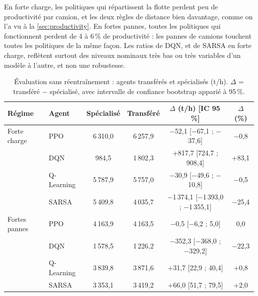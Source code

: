 \documentclass[11pt,a4paper]{article}
\newif\ifrevmarks
\newcommand{\revtag}[1]{\ifrevmarks\textsuperscript{\textcolor{red!70!black}{\scriptsize[#1]}}\fi}
\newenvironment{revbloc}[1]{\par\ifrevmarks\color{revcolor}\noindent\revtag{#1}\ \fi}{\par}
\newif\ifcorrmarks
\newcommand{\corr}[1]{\ifcorrmarks\textcolor{corrcolor}{#1}\else#1\fi}
\begin{document}
\begin{revbloc}{T31}
\corr{En forte charge, les politiques qui répartissent la flotte perdent peu de productivité par camion, et les deux règles de distance bien davantage, comme on l'a vu à la \cref{sec:productivity}. En fortes pannes, toutes les politiques qui fonctionnent perdent de 4 à 6\,\% de productivité : les pannes de camions touchent toutes les politiques de la même façon. Les ratios de DQN, et de SARSA en forte charge, reflètent surtout} des niveaux nominaux très bas ou très variables d'un modèle à l'autre, et non une robustesse.
\end{revbloc}

\begin{revbloc}{T31}
\begin{table}[H]
\centering
\caption{Évaluation sans réentraînement : agents transférés et spécialisés (t/h). $\Delta$ = transféré $-$ spécialisé, avec intervalle de confiance bootstrap apparié à 95\,\%.}
\label{tab:transfer}
\small
\setlength{\tabcolsep}{4pt}
\begin{tabular}{llcccc}
\toprule
\textbf{Régime} & \textbf{Agent} & \textbf{Spécialisé} & \textbf{Transféré} & \textbf{$\Delta$ (t/h) [IC 95\,\%]} & \textbf{$\Delta$ (\%)} \\
\midrule
Forte charge  & PPO        & 6\,310,0 & 6\,257,9 & $-$52,1 [$-$67,1 ; $-$37,6] & $-$0,8 \\
              & DQN        & 984,5    & 1\,802,3 & +817,7 [724,7 ; 908,4] & +83,1 \\
              & Q-Learning & 5\,787,9 & 5\,757,0 & $-$30,9 [$-$49,6 ; $-$10,8] & $-$0,5 \\
              & SARSA      & 5\,409,8 & 4\,035,7 & $-$1\,374,1 [$-$1\,393,0 ; $-$1\,355,1] & $-$25,4 \\
\midrule
Fortes pannes & PPO        & 4\,163,9 & 4\,163,5 & $-$0,5 [$-$6,2 ; 5,0] & 0,0 \\
              & DQN        & 1\,578,5 & 1\,226,2 & $-$352,3 [$-$368,0 ; $-$329,2] & $-$22,3 \\
              & Q-Learning & 3\,839,8 & 3\,871,6 & +31,7 [22,9 ; 40,4] & +0,8 \\
              & SARSA      & 3\,353,1 & 3\,419,2 & +66,0 [51,7 ; 79,5] & +2,0 \\
\bottomrule
\end{tabular}
\end{table}


\end{revbloc}
\end{document}
